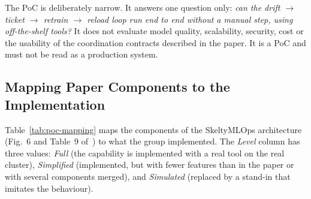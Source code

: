 The PoC is deliberately narrow. It answers one question only: \emph{can the drift $\rightarrow$ ticket $\rightarrow$ retrain $\rightarrow$ reload loop run end to end without a manual step, using off-the-shelf tools?} It does not evaluate model quality, scalability, security, cost or the usability of the coordination contracts described in the paper. It is a PoC and must not be read as a production system.

\subsection{Mapping Paper Components to the Implementation}

Table~\ref{tab:poc-mapping} maps the components of the SkeltyMLOps architecture (Fig.~6 and Table~9 of~\papercite{}) to what the group implemented. The \emph{Level} column has three values: \emph{Full} (the capability is implemented with a real tool on the real cluster), \emph{Simplified} (implemented, but with fewer features than in the paper or with several components merged), and \emph{Simulated} (replaced by a stand-in that imitates the behaviour).

